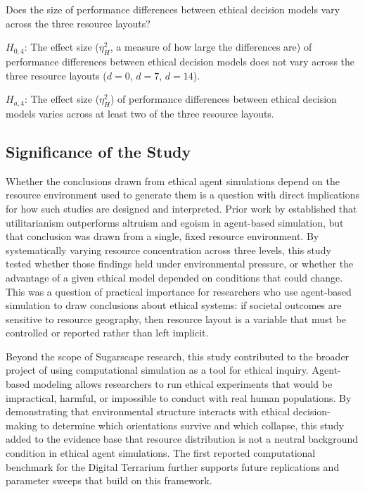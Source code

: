 \documentclass{icsthesis}
\begin{document}
\begin{mainmatter}
\begin{description}
    \bigskip
    \item[\textbf{RQ4.}] Does the size of performance differences between ethical decision models vary across the three resource layouts?

    \smallskip
    \noindent $H_{0,4}$: The effect size ($\eta^2_H$, a measure of how large the differences are) of performance differences between ethical decision models does not vary across the three resource layouts ($d = 0$, $d = 7$, $d = 14$).

    \smallskip
    \noindent $H_{a,4}$: The effect size ($\eta^2_H$) of performance differences between ethical decision models varies across at least two of the three resource layouts.

\end{description}

\subsection{Significance of the Study}
Whether the conclusions drawn from ethical agent simulations depend on the resource environment used to generate them is a question with direct implications for how such studies are designed and interpreted. Prior work by \citet{KremerHerman2024} established that utilitarianism outperforms altruism and egoism in agent-based simulation, but that conclusion was drawn from a single, fixed resource environment. By systematically varying resource concentration across three levels, this study tested whether those findings held under environmental pressure, or whether the advantage of a given ethical model depended on conditions that could change. This was a question of practical importance for researchers who use agent-based simulation to draw conclusions about ethical systems: if societal outcomes are sensitive to resource geography, then resource layout is a variable that must be controlled or reported rather than left implicit.

Beyond the scope of Sugarscape research, this study contributed to the broader project of using computational simulation as a tool for ethical inquiry. Agent-based modeling allows researchers to run ethical experiments that would be impractical, harmful, or impossible to conduct with real human populations. By demonstrating that environmental structure interacts with ethical decision-making to determine which orientations survive and which collapse, this study added to the evidence base that resource distribution is not a neutral background condition in ethical agent simulations. The first reported computational benchmark for the Digital Terrarium further supports future replications and parameter sweeps that build on this framework.


\end{mainmatter}
\end{document}
